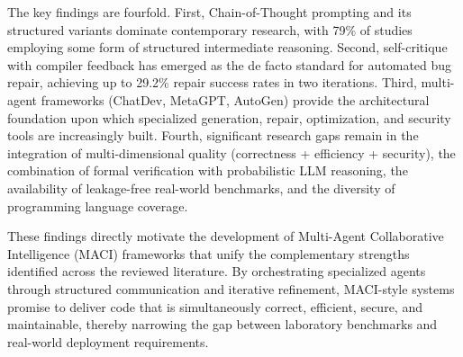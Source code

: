 \documentclass[11pt,a4paper]{article}
\begin{document}
The key findings are fourfold. First, Chain-of-Thought prompting and its structured variants dominate contemporary research, with 79\% of studies employing some form of structured intermediate reasoning. Second, self-critique with compiler feedback has emerged as the de facto standard for automated bug repair, achieving up to 29.2\% repair success rates in two iterations. Third, multi-agent frameworks (ChatDev, MetaGPT, AutoGen) provide the architectural foundation upon which specialized generation, repair, optimization, and security tools are increasingly built. Fourth, significant research gaps remain in the integration of multi-dimensional quality (correctness + efficiency + security), the combination of formal verification with probabilistic LLM reasoning, the availability of leakage-free real-world benchmarks, and the diversity of programming language coverage.

These findings directly motivate the development of Multi-Agent Collaborative Intelligence (MACI) frameworks that unify the complementary strengths identified across the reviewed literature. By orchestrating specialized agents through structured communication and iterative refinement, MACI-style systems promise to deliver code that is simultaneously correct, efficient, secure, and maintainable, thereby narrowing the gap between laboratory benchmarks and real-world deployment requirements.
\end{document}
